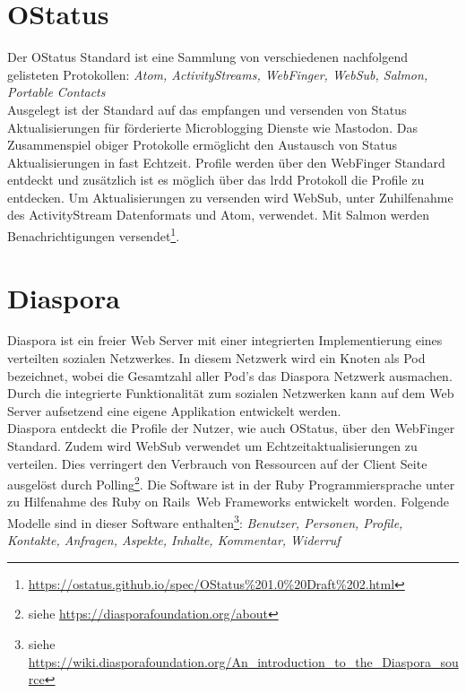 \section{OStatus}
\label{sub:ostatus}
	Der OStatus Standard ist eine Sammlung von verschiedenen nachfolgend gelisteten Protokollen: \textit{Atom, ActivityStreams, WebFinger, WebSub, Salmon, Portable Contacts}\\
	
	Ausgelegt ist der Standard auf das empfangen und versenden von Status Aktualisierungen für förderierte Microblogging Dienste wie Mastodon. Das Zusammenspiel obiger Protokolle ermöglicht den Austausch von Status Aktualisierungen in fast Echtzeit. Profile werden über den WebFinger Standard entdeckt und zusätzlich ist es möglich über das \gls{lrdd} Protokoll die Profile zu entdecken. Um Aktualisierungen zu versenden wird WebSub, unter Zuhilfenahme des ActivityStream Datenformats und Atom, verwendet. Mit Salmon werden Benachrichtigungen versendet\footnote{\url{https://ostatus.github.io/spec/OStatus\%201.0\%20Draft\%202.html}}.
\section{Diaspora}
\label{sub:diaspora}
	Diaspora ist ein freier Web Server mit einer integrierten Implementierung eines verteilten sozialen Netzwerkes. In diesem Netzwerk wird ein Knoten als Pod bezeichnet, wobei die Gesamtzahl aller Pod's das Diaspora Netzwerk ausmachen. Durch die integrierte Funktionalität zum sozialen Netzwerken kann auf dem Web Server aufsetzend eine eigene Applikation entwickelt werden.\\ 
	
	Diaspora entdeckt die Profile der Nutzer, wie auch OStatus, über den WebFinger Standard. Zudem wird WebSub verwendet um Echtzeitaktualisierungen zu verteilen. Dies verringert den Verbrauch von Ressourcen auf der Client Seite ausgelöst durch Polling\footnote{siehe \url{https://diasporafoundation.org/about}}. Die Software ist in der Ruby Programmiersprache unter zu Hilfenahme des \glqq Ruby on Rails\grqq~Web Frameworks entwickelt worden. Folgende Modelle sind in dieser Software enthalten\footnote{siehe \url{https://wiki.diasporafoundation.org/An_introduction_to_the_Diaspora_source}}:
	\textit{Benutzer, Personen, Profile, Kontakte, Anfragen, Aspekte, Inhalte, Kommentar, Widerruf}
